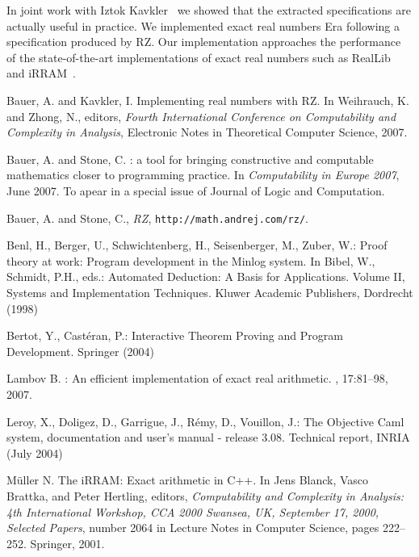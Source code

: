 \documentclass{article}
\begin{document}
In joint work with Iztok Kavkler~\cite{Era} we showed that the
extracted specifications are actually useful in practice. We
implemented exact real numbers Era following a specification produced
by RZ. Our implementation approaches the performance of the
state-of-the-art implementations of exact real numbers such as
RealLib~\cite{RealLib} and iRRAM~\cite{iRRAM}.

\begin{thebibliography}{10}\label{bibliography}

Bauer, A. and Kavkler, I.
\newblock Implementing real numbers with {RZ}.
\newblock In Weihrauch, K. and Zhong, N., editors, {\em Fourth International
  Conference on Computability and Complexity in Analysis}, Electronic Notes in
  Theoretical Computer Science, 2007.

Bauer, A. and Stone, C.
: a tool for bringing constructive and computable mathematics
  closer to programming practice.
\newblock In {\em Computability in Europe 2007}, June 2007.
\newblock To apear in a special issue of Journal of Logic and Computation.

Bauer, A. and Stone, C., \emph{{RZ}}, \texttt{http://math.andrej.com/rz/}.

Benl, H., Berger, U., Schwichtenberg, H., Seisenberger, M., Zuber, W.:
\newblock Proof theory at work: Program development in the {M}inlog system.
\newblock In Bibel, W., Schmidt, P.H., eds.: Automated Deduction: A Basis for
  Applications. Volume {II}, Systems and Implementation Techniques.
\newblock Kluwer Academic Publishers, Dordrecht (1998)

Bertot, Y., Cast\'eran, P.:
\newblock Interactive Theorem Proving and Program Development.
\newblock Springer (2004)

Lambov B.
: An efficient implementation of exact real arithmetic.
, 17:81--98, 2007.

Leroy, X., Doligez, D., Garrigue, J., R\'emy, D., Vouillon, J.:
\newblock The {Objective Caml} system, documentation and user's manual -
  release 3.08.
\newblock Technical report, INRIA (July 2004)

M\"{u}ller N.
\newblock The {iRRAM}: Exact arithmetic in {C}++.
\newblock In Jens Blanck, Vasco Brattka, and Peter Hertling, editors, {\em
  Computability and Complexity in Analysis: 4th International Workshop, CCA
  2000 Swansea, UK, September 17, 2000, Selected Papers}, number 2064 in
  Lecture Notes in Computer Science, pages 222--252. Springer, 2001.

\end{thebibliography}
\end{document}
